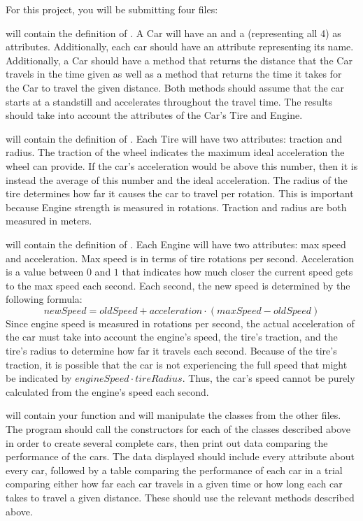 \documentclass[11pt]{cselabheader}
\begin{document}
\begin{ex}
  For this project, you will be submitting four files:

   will contain the definition of . A
  Car will have an  and a   (representing all 4)
  as attributes. Additionally, each car should have an attribute representing its name.
  Additionally, a Car should have a method  that returns
  the distance that the Car travels in the time given as well as a method
   that returns the time it takes for the Car to travel
  the given distance. Both methods should assume that
  the car starts at a standstill and accelerates throughout the travel time. The results
  should take into account the attributes of the Car's Tire and Engine.
  
   will contain the definition of . Each Tire
  will have two attributes: traction and radius. The traction of the wheel indicates the
  maximum ideal acceleration the wheel can provide. If the car's acceleration would be
  above this number, then it is instead the average of this number and the
  ideal acceleration. The radius of the tire determines how far it causes the
  car to travel per rotation. This is important because Engine strength is
  measured in rotations. Traction and radius are both measured in meters.
  
   will contain the definition of
  . Each Engine will have two attributes:
  max speed and acceleration. Max speed is in terms of tire rotations per
  second. Acceleration is a value between $0$ and $1$ that indicates how much
  closer the current speed gets to the max speed each second. Each second, the
  new speed is determined by the following formula:
  $$newSpeed = oldSpeed + acceleration \cdot \left(maxSpeed - oldSpeed\right)$$
  Since engine speed is measured in rotations per second, the actual
  acceleration of the car must take into account the engine's speed, the tire's
  traction, and the tire's radius to determine how far it travels each second.
  Because of the tire's traction, it is possible that the car is not
  experiencing the full speed that might be indicated by
  $engineSpeed \cdot tireRadius$. Thus, the car's speed cannot be purely
  calculated from the engine's speed each second.

   will contain your  function and will
  manipulate the classes from the other files. The program should call the
  constructors for each of the classes described above in order to create
  several complete cars, then print out data comparing the performance of the
  cars. The data displayed should include every attribute about every car,
  followed by a table comparing the performance of each car in a trial
  comparing either how far each car travels in a given time or how long each
  car takes to travel a given distance. These should use the relevant methods
  described above.
\end{ex}
\end{document}
